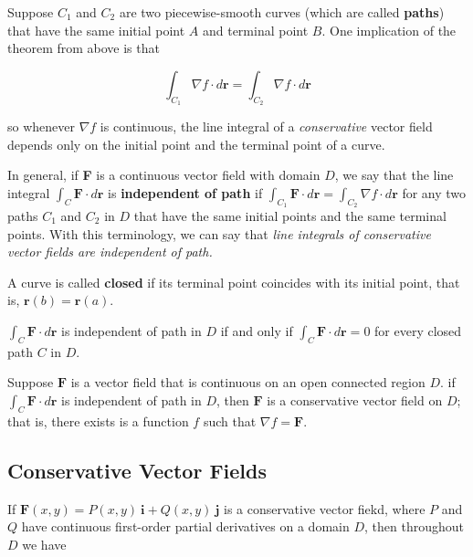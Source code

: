 \documentclass{article}
\begin{document}
Suppose $C_1$ and $C_2$ are two piecewise-smooth curves (which are called \textbf{paths}) that have the same initial point $A$ and terminal point $B$. One implication of the theorem from above is that 

\begin{equation*}
    \int_{C_1} \nabla f \cdot d \mathbf{r} = \int_{C_2} \nabla f \cdot d \mathbf{r} 
\end{equation*}

so whenever $\nabla f$ is continuous, the line integral of a \textit{conservative} vector field depends only on the initial point and the terminal point of a curve.

In general, if \textbf{F} is a continuous vector field with domain $D$, we say that the line integral $\int_C \mathbf{F} \cdot d \mathbf{r}$ is \textbf{independent of path} if $\int_{C_1} \mathbf{F} \cdot d \mathbf{r} = \int_{C_2} \nabla f \cdot d \mathbf{r}$ for any two paths $C_1$ and $C_2$ in $D$ that have the same initial points and the same terminal points. With this terminology, we can say that \textit{line integrals of conservative vector fields are independent of path.}

A curve is called \textbf{closed} if its terminal point coincides with its initial point, that is, $\mathbf{r}(b) = \mathbf{r}(a)$.

\begin{center}
    $\int_C \mathbf{F} \cdot d \mathbf{r}$ is independent of path in $D$ if and only if $\int_C \mathbf{F} \cdot d \mathbf{r} = 0$ for every closed path $C$ in $D$. 
\end{center}

\begin{center}
    Suppose $\mathbf{F}$ is a vector field that is continuous on an open connected region $D$. if $\int_C \mathbf{F} \cdot d \mathbf{r}$ is independent of path in $D$, then $\mathbf{F}$ is a conservative vector field on $D$; that is, there exists is a function $f$ such that $\nabla f = \mathbf{F}$. 
\end{center}

\subsection{Conservative Vector Fields}

If $\mathbf{F}(x,y) = P(x,y) \ \mathbf{i}  + Q(x,y) \ \mathbf{j}$ is a conservative vector fiekd, where $P$ and $Q$ have continuous first-order partial derivatives on a domain $D$, then throughout $D$ we have 
\end{document}
